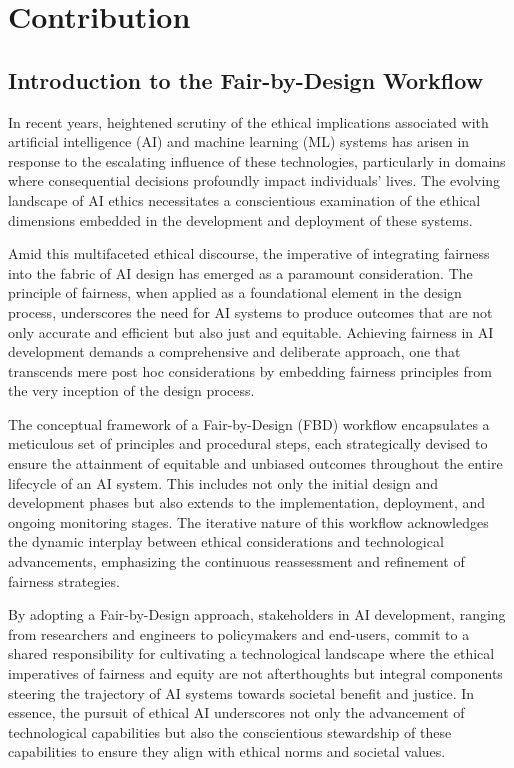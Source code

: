 \chapter{Contribution} %
\label{chap:contribution}

\section{Introduction to the Fair-by-Design Workflow}
\label{section:workflow-introduction}

In recent years, heightened scrutiny of the ethical implications associated with artificial intelligence (AI) and machine learning (ML) systems has arisen in response to the escalating influence of these technologies, particularly in domains where consequential decisions profoundly impact individuals' lives. The evolving landscape of AI ethics necessitates a conscientious examination of the ethical dimensions embedded in the development and deployment of these systems.

Amid this multifaceted ethical discourse, the imperative of integrating fairness into the fabric of AI design has emerged as a paramount consideration. The principle of fairness, when applied as a foundational element in the design process, underscores the need for AI systems to produce outcomes that are not only accurate and efficient but also just and equitable. Achieving fairness in AI development demands a comprehensive and deliberate approach, one that transcends mere post hoc considerations by embedding fairness principles from the very inception of the design process.

The conceptual framework of a Fair-by-Design (FBD) workflow encapsulates a meticulous set of principles and procedural steps, each strategically devised to ensure the attainment of equitable and unbiased outcomes throughout the entire lifecycle of an AI system. This includes not only the initial design and development phases but also extends to the implementation, deployment, and ongoing monitoring stages. The iterative nature of this workflow acknowledges the dynamic interplay between ethical considerations and technological advancements, emphasizing the continuous reassessment and refinement of fairness strategies.

By adopting a Fair-by-Design approach, stakeholders in AI development, ranging from researchers and engineers to policymakers and end-users, commit to a shared responsibility for cultivating a technological landscape where the ethical imperatives of fairness and equity are not afterthoughts but integral components steering the trajectory of AI systems towards societal benefit and justice. In essence, the pursuit of ethical AI underscores not only the advancement of technological capabilities but also the conscientious stewardship of these capabilities to ensure they align with ethical norms and societal values.


